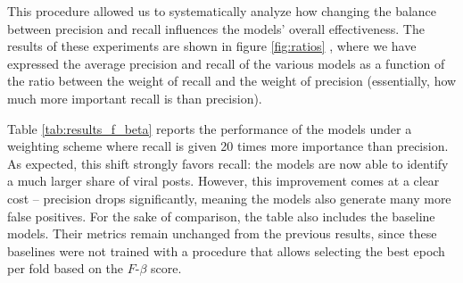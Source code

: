 \documentclass[a4paper,twoside,12pt]{book}
\begin{document}
This procedure allowed us to systematically analyze how changing the balance between precision and recall influences the models’ overall effectiveness. The results of these experiments are shown in figure \ref{fig:ratios} , where we have expressed the average precision and recall of the various models as a function of the ratio between the weight of recall and the weight of precision (essentially, how much more important recall is than precision). 

\begin{table}[h!]
	\centering
	\caption{Performance of different models under an $F\text{-}\beta$ weighting scheme where recall is heavily prioritized (20 times more weight than precision). Cross-Validation averages. Baseline models are included for reference; their values remain unchanged as they were not trained with epoch selection based on $F\text{-}\beta$.}
	\label{tab:results_f_beta}
	\vspace{1em}
\end{table}

Table \ref{tab:results_f_beta} reports the performance of the models under a weighting scheme where recall is given 20 times more importance than precision. As expected, this shift strongly favors recall: the models are now able to identify a much larger share of viral posts. However, this improvement comes at a clear cost -- precision drops significantly, meaning the models also generate many more false positives. For the sake of comparison, the table also includes the baseline models. Their metrics remain unchanged from the previous results, since these baselines were not trained with a procedure that allows selecting the best epoch per fold based on the $F\text{-}\beta$ score. 
\end{document}
